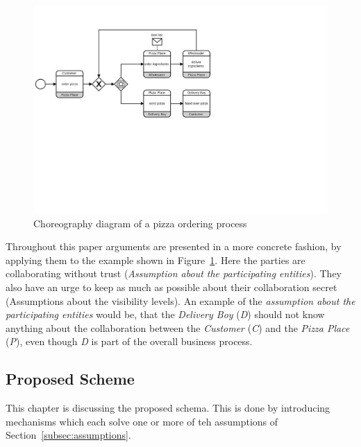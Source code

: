 \documentclass[runningheads]{llncs}
\newcommand{\ber}[1]{\textit{#1}}
\newcommand{\reffig}[1]{Figure~\ref{#1}}
\newcommand{\refsec}[1]{Section~\ref{#1}}
\newcommand{\noteme}[1]{\todo{#1}}
\begin{document}
\begin{center}
\begin{figure}
    \centering
    \includegraphics[trim=0cm 9.5cm 11.5cm 2.4cm,clip=true,scale=0.65]{newbpmn.pdf}
    \caption{Choreography diagram of a pizza ordering process} 
    \label{fig:simple_bpmn}
\end{figure}
\end{center}


Throughout this paper arguments are presented in a more concrete fashion, by applying them to the example shown in \reffig{fig:simple_bpmn}. Here the parties are collaborating without trust (\textit{Assumption about the participating entities}). They also have an urge to keep as much as possible about their collaboration secret (Assumptions about the visibility levels). An example of the \textit{assumption about the participating entities} would be, that the \textit{Delivery Boy} (\ber{D}) should not know anything about the collaboration between the \textit{Customer} (\ber{C}) and the \textit{Pizza Place} (\ber{P}), even though \ber{D} is part of the overall business process. 



\subsection{Proposed Scheme} \label{subsec:scheme}


This chapter is discussing the proposed schema. This is done by introducing mechanisms which each solve one or more of teh assumptions of \refsec{subsec:assumptions}.
\end{document}
